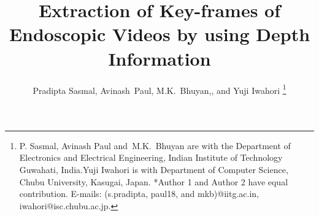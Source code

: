 \documentclass[journal]{IEEEtran}
\begin{document}
%
\title{Extraction of Key-frames of Endoscopic Videos by using Depth Information}
%
%
%

\author{Pradipta Sasmal,\IEEEmembership{}
Avinash~Paul,\IEEEmembership{}
M.K.~Bhuyan,, and Yuji Iwahori
\thanks{P. Sasmal, Avinash Paul
       and~M.K.~Bhuyan are with the Department
of Electronics and Electrical Engineering, Indian Institute of Technology Guwahati, India.Yuji Iwahori is with Department of Computer Science, Chubu University, Kasugai, Japan.
*Author 1 and Author 2 have equal contribution.
E-mails: (s.pradipta, paul18, and mkb)@iitg.ac.in, iwahori@isc.chubu.ac.jp.}%
}

% 
%
\end{document}
